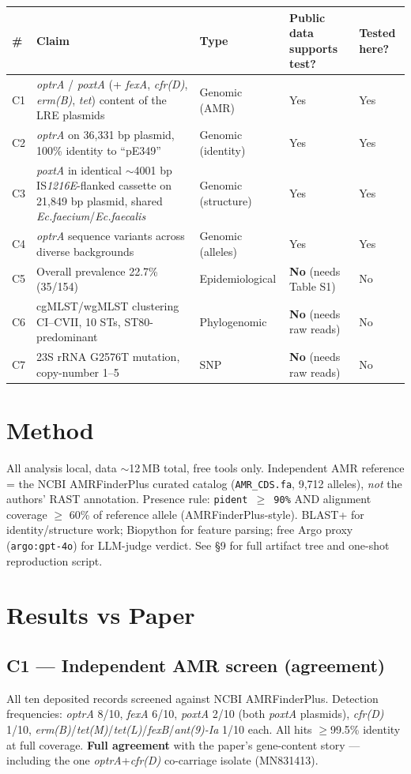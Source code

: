 \documentclass[11pt,letterpaper]{article}
\begin{document}
\begin{longtable}{@{}p{0.4cm}p{7cm}p{2.5cm}p{2.5cm}p{2cm}@{}}
\toprule
\# & Claim & Type & Public data supports test? & Tested here? \\
\midrule
\endhead
C1 & \emph{optrA} / \emph{poxtA} (+ \emph{fexA}, \emph{cfr(D)}, \emph{erm(B)}, \emph{tet}) content of the LRE plasmids & Genomic (AMR) & Yes & Yes \\
C2 & \emph{optrA} on 36{,}331 bp plasmid, 100\% identity to ``pE349'' & Genomic (identity) & Yes & Yes \\
C3 & \emph{poxtA} in identical $\sim$4001 bp IS\emph{1216E}-flanked cassette on 21{,}849 bp plasmid, shared \emph{Ec.faecium}/\emph{Ec.faecalis} & Genomic (structure) & Yes & Yes \\
C4 & \emph{optrA} sequence variants across diverse backgrounds & Genomic (alleles) & Yes & Yes \\
C5 & Overall prevalence 22.7\% (35/154) & Epidemiological & \textbf{No} (needs Table S1) & No \\
C6 & cgMLST/wgMLST clustering CI--CVII, 10 STs, ST80-predominant & Phylogenomic & \textbf{No} (needs raw reads) & No \\
C7 & 23S rRNA G2576T mutation, copy-number 1--5 & SNP & \textbf{No} (needs raw reads) & No \\
\bottomrule
\end{longtable}

\section{Method}
All analysis local, data $\sim$12\,MB total, free tools only. Independent AMR reference = the NCBI AMRFinderPlus curated catalog (\texttt{AMR\_CDS.fa}, 9{,}712 alleles), \emph{not} the authors' RAST annotation. Presence rule: \texttt{pident $\geq$ 90\%} AND alignment coverage $\geq$ 60\% of reference allele (AMRFinderPlus-style). BLAST+ for identity/structure work; Biopython for feature parsing; free Argo proxy (\texttt{argo:gpt-4o}) for LLM-judge verdict. See \S9 for full artifact tree and one-shot reproduction script.

\section{Results vs Paper}

\subsection{C1 --- Independent AMR screen (agreement)}
All ten deposited records screened against NCBI AMRFinderPlus. Detection frequencies: \emph{optrA} 8/10, \emph{fexA} 6/10, \emph{poxtA} 2/10 (both \emph{poxtA} plasmids), \emph{cfr(D)} 1/10, \emph{erm(B)}/\emph{tet(M)}/\emph{tet(L)}/\emph{fexB}/\emph{ant(9)-Ia} 1/10 each. All hits $\geq$99.5\% identity at full coverage. \textbf{Full agreement} with the paper's gene-content story --- including the one \emph{optrA}+\emph{cfr(D)} co-carriage isolate (MN831413).
\end{document}
